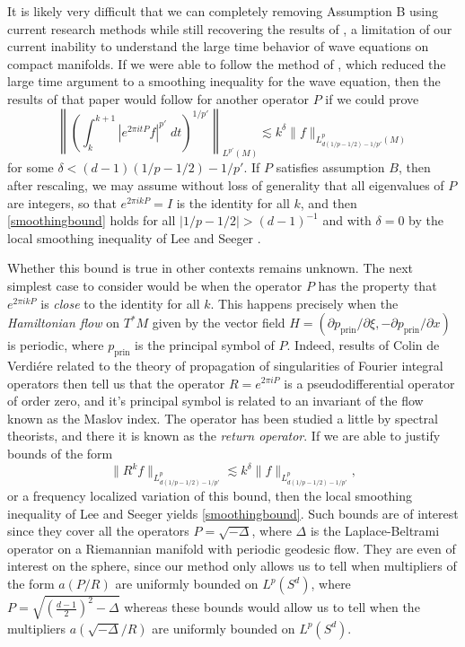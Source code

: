 \documentclass[11pt]{article}
\begin{document}
It is likely very difficult that we can completely removing Assumption B using current research methods while still recovering the results of \cite{DensonCharacterization}, a limitation of our current inability to understand the large time behavior of wave equations on compact manifolds. If we were able to follow the method of \cite{DensonThesis}, which reduced the large time argument to a smoothing inequality for the wave equation, then the results of that paper would follow for another operator $P$ if we could prove
%
\begin{equation} \label{smoothingbound}
	\left\| \left( \int_k^{k+1} |e^{2 \pi i t P} f|^{p'}\; dt \right)^{1/p'} \right\|_{L^{p'}(M)} \lesssim k^\delta \| f \|_{L^p_{d(1/p - 1/2) - 1/p'}(M)}
\end{equation}
%
for some $\delta < (d-1)(1/p - 1/2) - 1/p'$. If $P$ satisfies assumption $B$, then after rescaling, we may assume without loss of generality that all eigenvalues of $P$ are integers, so that $e^{2 \pi i k P} = I$ is the identity for all $k$, and then \eqref{smoothingbound} holds for all $|1/p - 1/2| > (d-1)^{-1}$ and with $\delta = 0$ by the local smoothing inequality of Lee and Seeger \cite{LeeSeeger}. 

Whether this bound is true in other contexts remains unknown. The next simplest case to consider would be when the operator $P$ has the property that $e^{2 \pi i k P}$ is \emph{close} to the identity for all $k$. This happens precisely when the \emph{Hamiltonian flow} on $T^* M$ given by the vector field $H = ( \partial p_{\text{prin}} / \partial \xi , - \partial p_{\text{prin}} / \partial x)$ is periodic, where $p_{\text{prin}}$ is the principal symbol of $P$. Indeed, results of Colin de Verdi\'{e}re \cite{ColinDeVerdiere} related to the theory of propagation of singularities of Fourier integral operators then tell us that the operator $R = e^{2 \pi i P}$ is a pseudodifferential operator of order zero, and it's principal symbol is related to an invariant of the flow known as the Maslov index. The operator has been studied a little by spectral theorists, and there it is known as the \emph{return operator}. If we are able to justify bounds of the form
%
\[ \| R^k f \|_{L^p_{d(1/p - 1/2) - 1/p'}} \lesssim k^\delta \| f \|_{L^p_{d(1/p - 1/2) - 1/p'}}, \]
%
or a frequency localized variation of this bound, then the local smoothing inequality of Lee and Seeger yields \eqref{smoothingbound}. Such bounds are of interest since they cover all the operators $P = \sqrt{-\Delta}$, where $\Delta$ is the Laplace-Beltrami operator on a Riemannian manifold with periodic geodesic flow. They are even of interest on the sphere, since our method only allows us to tell when multipliers of the form $a( P/R )$ are uniformly bounded on $L^p(S^d)$, where $P = \sqrt{ ( {\scriptstyle \frac{d-1}{2}} )^2 - \Delta }$ whereas these bounds would allow us to tell when the multipliers $a( \sqrt{-\Delta} / R )$ are uniformly bounded on $L^p(S^d)$.
\end{document}
